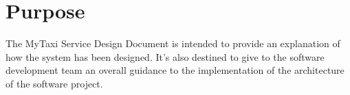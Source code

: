 \documentclass[../../../../dd.tex]{subfiles}
\begin{document}
	\section{Purpose}
		The MyTaxi Service Design Document is intended to provide an explanation of how the system has been designed. It's also destined to give to the software development team an overall guidance to the implementation of the architecture of the software project.
		
\end{document}

